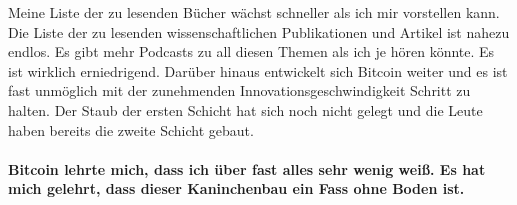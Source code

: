 Meine Liste der zu lesenden Bücher wächst schneller als ich mir vorstellen kann.
Die Liste der zu lesenden wissenschaftlichen Publikationen und Artikel ist
nahezu endlos. Es gibt mehr Podcasts zu all diesen Themen als ich je hören
könnte. Es ist wirklich erniedrigend. Darüber hinaus entwickelt sich Bitcoin
weiter und es ist fast unmöglich mit der zunehmenden Innovationsgeschwindigkeit
Schritt zu halten. Der Staub der ersten Schicht hat sich noch nicht gelegt und
die Leute haben bereits die zweite Schicht gebaut.

\paragraph{Bitcoin lehrte mich, dass ich über fast alles sehr wenig weiß. Es hat
mich gelehrt, dass dieser Kaninchenbau ein Fass ohne Boden ist.}

%
%
%
%
%
